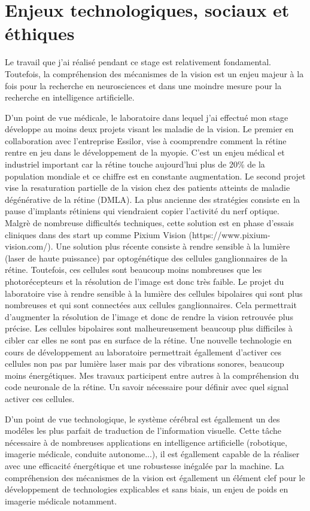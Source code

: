 \section{Enjeux technologiques, sociaux et éthiques}\label{app:enjeux}

Le travail que j'ai réalisé pendant ce stage est relativement fondamental.
Toutefois, la compréhension des mécanismes de la vision est un enjeu majeur à
la fois pour la recherche en neurosciences et dans une moindre mesure pour la
recherche en intelligence artificielle.

D'un point de vue médicale, le laboratoire dans lequel j'ai effectué mon stage
développe au moins deux projets visant les maladie de la vision.
Le premier en collaboration avec l'entreprise Essilor, vise à coomprendre
comment la rétine rentre en jeu dans le développement de la myopie. C'est un
enjeu médical
et industriel important car la rétine touche aujourd'hui plus de 20\% de la
population mondiale et ce chiffre est en constante augmentation.
Le second projet vise la resaturation partielle de la vision chez des patients
atteints de maladie dégénérative de la rétine (DMLA).
La plus ancienne des stratégies consiste en la pause d'implants rétiniens qui
viendraient copier l'activité du nerf optique.
Malgrè de nombreuse difficultés techniques, cette solution est en phase
d'essais cliniques dans des start up comme Pixium Vision
(https://www.pixium-vision.com/).
Une solution plus récente consiste à rendre sensible à la lumière (laser de
haute puissance) par optogénétique des
cellules ganglionnaires de la rétine.
Toutefois, ces cellules sont beaucoup moins nombreuses que les photorécepteurs
et la résolution de l'image est donc très faible.
Le projet du laboratoire vise à rendre sensible à la lumière des cellules
bipolaires qui sont plus nombreuses et qui sont connectées aux cellules
ganglionnaires.
Cela permettrait d'augmenter la résolution de l'image et donc de rendre la
vision retrouvée plus précise.
Les cellules bipolaires sont malheureusement beaucoup plus difficiles à cibler
car elles ne sont pas en surface de la rétine.
Une nouvelle technologie en cours de développement au laboratoire permettrait
égallement d'activer ces cellules non pas par lumière laser mais par des
vibrations sonores, beaucoup moins énergétiques.
Mes travaux participent entre autres à la compréhension du code neuronale de la
rétine. Un savoir nécessaire pour définir avec quel signal activer ces
cellules.

D'un point de vue technologique, le système cérébral est égallement un des
modéles les plus parfait de traduction de l'information visuelle.
Cette tâche nécessaire à de nombreuses applications en intelligence
artificielle (robotique, imagerie médicale, conduite autonome...), il est
égallement capable de la réaliser avec une efficacité énergétique et une
robustesse inégalée par la machine. La compréhension des mécanismes de la
vision est égallement un élément clef pour le développement de technologies
explicables et sans biais, un enjeu de poids en imagerie médicale notamment.

